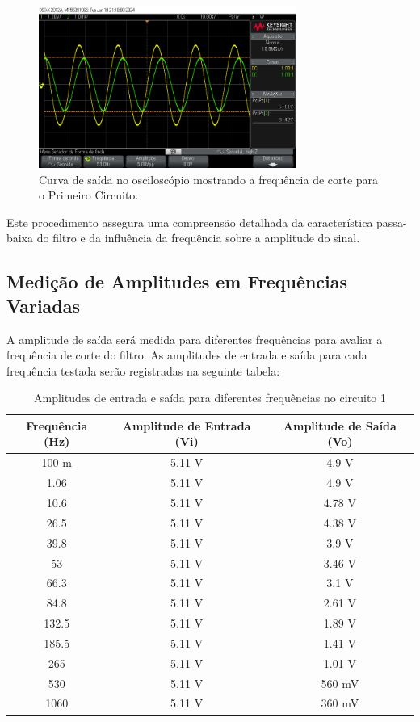 \documentclass[
	12pt,				%
	openright,			%
	twoside,			%
	a4paper,			%
	english,			%
	french,				%
	spanish,			%
	brazil,				%
	]{abntex2}
\begin{document}
\begin{figure}[H]
    \centering
    \includegraphics[width=0.75\textwidth]{imgs/first_oscilloscope_cutoff_frequency.jpg}
    \caption{Curva de saída no osciloscópio mostrando a frequência de corte para o Primeiro Circuito.}
    \label{fig:first_oscilloscope_cutoff_frequency}
\end{figure}

Este procedimento assegura uma compreensão detalhada da característica passa-baixa do filtro e da influência da frequência sobre a amplitude do sinal.

\subsection{Medição de Amplitudes em Frequências Variadas}

A amplitude de saída será medida para diferentes frequências para avaliar a frequência de corte do filtro. As amplitudes de entrada e saída para cada frequência testada serão registradas na seguinte tabela:

\begin{table}[H]  
    \centering
    \begin{tabular}{|c|c|c|}
        \hline
        Frequência (Hz) & Amplitude de Entrada (Vi) & Amplitude de Saída (Vo) \\
        \hline
        100 m & 5.11 V & 4.9 V \\
        1.06 & 5.11 V & 4.9 V \\
        10.6 & 5.11 V & 4.78 V \\
        26.5 & 5.11 V & 4.38 V \\
        39.8 & 5.11 V & 3.9 V \\
        53 & 5.11 V & 3.46 V \\
        66.3 & 5.11 V & 3.1 V \\
        84.8 & 5.11 V & 2.61 V \\
        132.5 & 5.11 V & 1.89 V \\
        185.5 & 5.11 V & 1.41 V \\
        265 & 5.11 V & 1.01 V \\
        530 & 5.11 V & 560 mV \\
        1060 & 5.11 V & 360 mV \\
        \hline
    \end{tabular}
    \caption{Amplitudes de entrada e saída para diferentes frequências no circuito 1}
    \label{tab:frequency_response}
\end{table}
\end{document}
